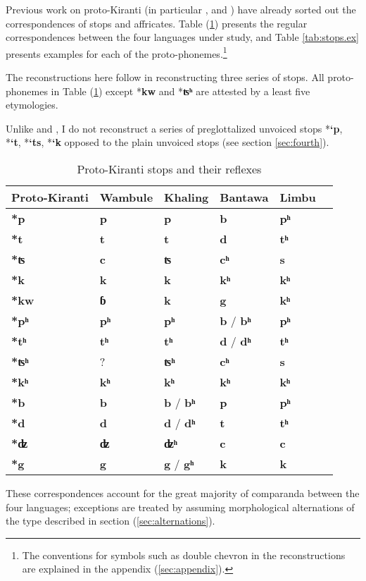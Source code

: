 \documentclass[oldfontcommands,oneside,a4paper,11pt]{article}
\newcommand{\ipa}[1]{\textbf{{\phon\mbox{#1}}}} %
\begin{document}
Previous work on proto-Kiranti (in particular \citealt{starostin94kiranti}, \citealt{michailovsky94stops} and \citealt{opgenort05jero}) have already sorted out the correspondences of stops and affricates. Table (\ref{tab:stops}) presents the regular correspondences between the four languages under study, and Table \ref{tab:stops.ex} presents examples for each of the proto-phonemes.\footnote{The conventions for symbols such as double chevron in the reconstructions are explained in the appendix (\ref{sec:appendix}).}


The reconstructions here follow \citet{michailovsky94stops} in reconstructing three series of stops.  All proto-phonemes in Table (\ref{tab:stops}) except *\ipa{kw} and *\ipa{ʦʰ} are attested by a least five etymologies.

Unlike \citet{starostin94kiranti} and \citet{opgenort05jero}, I do not reconstruct a series of preglottalized unvoiced stops *\ipa{`p},  *\ipa{`t},  *\ipa{`ts},  *\ipa{`k} opposed to the plain unvoiced stops (see section \ref{sec:fourth}). 


\begin{table}[h]
\caption{Proto-Kiranti stops and their reflexes} \centering \label{tab:stops}
\begin{tabular}{llllll}
\toprule
Proto-Kiranti & Wambule & Khaling & Bantawa & Limbu \\
\midrule
\ipa{*p} & \ipa{p} & \ipa{p} & \ipa{b} & \ipa{pʰ}  \\
\ipa{*t} & \ipa{t} & \ipa{t} & \ipa{d} & \ipa{tʰ}  \\
\ipa{*ʦ} & \ipa{c} & \ipa{ʦ} & \ipa{cʰ} & \ipa{s}  \\
\ipa{*k} & \ipa{k} & \ipa{k} & \ipa{kʰ} & \ipa{kʰ}  \\
\midrule
\ipa{*kw} & \ipa{ɓ} & \ipa{k} & \ipa{g} & \ipa{kʰ}  \\
\midrule
\ipa{*pʰ} & \ipa{pʰ} & \ipa{pʰ} & \ipa{b} / \ipa{bʰ}  & \ipa{pʰ}  \\
\ipa{*tʰ} & \ipa{tʰ} & \ipa{tʰ} & \ipa{d} / \ipa{dʰ} & \ipa{tʰ}  \\
\ipa{*ʦʰ} & ? & \ipa{ʦʰ} & \ipa{cʰ}  & \ipa{s}  \\
\ipa{*kʰ} & \ipa{kʰ} & \ipa{kʰ} & \ipa{kʰ} & \ipa{kʰ}  \\
\midrule
\ipa{*b} & \ipa{b} &\ipa{b} / \ipa{bʰ}  & \ipa{p} & \ipa{pʰ}  \\
\ipa{*d} & \ipa{d} & \ipa{d} / \ipa{dʰ}  & \ipa{t} & \ipa{tʰ}  \\
\ipa{*ʣ} & \ipa{ʣ} & \ipa{ʣʰ} & \ipa{c} & \ipa{c}  \\
\ipa{*g} & \ipa{g} & \ipa{g} / \ipa{gʰ}  & \ipa{k} & \ipa{k}  \\
\bottomrule
\end{tabular}
\end{table}
These correspondences account for the great majority of comparanda between the four languages; exceptions are treated by assuming  morphological alternations of the type described in section (\ref{sec:alternations}).
\end{document}
